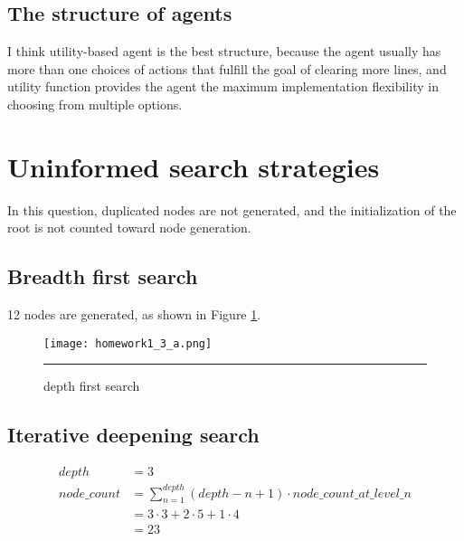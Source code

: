 \documentclass[12pt]{article}
\begin{document}
\subsection{The structure of agents}
I think utility-based agent is the best structure, because the agent usually has more than one choices of actions that fulfill the goal of clearing more lines, and utility function provides the agent the maximum implementation flexibility in choosing from multiple options.
\section{Uninformed search strategies}
In this question, duplicated nodes are not generated, and the initialization of the root is not counted toward node generation.
\subsection{Breadth first search}
12 nodes are generated, as shown in Figure \ref{fig:bfs}.
\begin{figure}[htb]
  \centering
      {\texttt{[image: homework1\_3\_a.png]}} \rule{1\linewidth}{1pt}
      \caption{depth first search}
      \label{fig:bfs}
\end{figure}
\subsection{Iterative deepening search}
\begin{align*}
  depth &= 3 \\
  node\_count &= \sum_{n=1}^{depth} (depth-n+1) \cdot node\_count\_at\_level\_n \\
  &= 3 \cdot 3 + 2 \cdot 5 + 1 \cdot 4 \\
  &= 23 \\
\end{align*}
\end{document}
